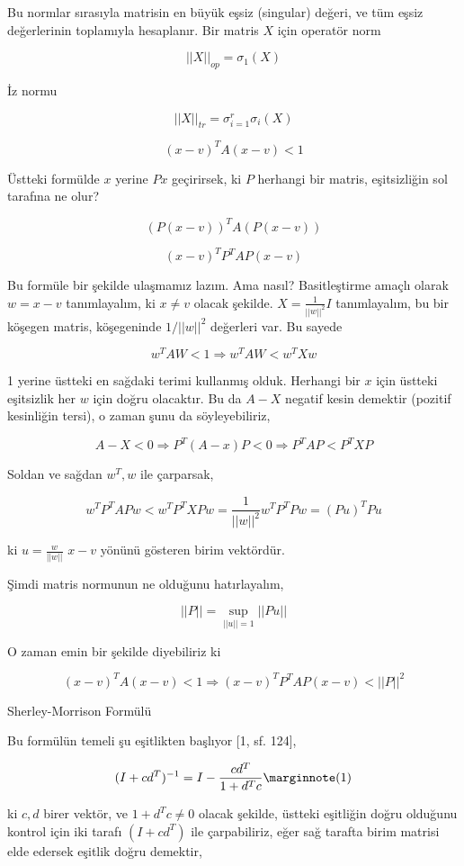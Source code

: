 \documentclass[12pt,fleqn]{article}\usepackage{../../common}
\begin{document}
Bu normlar sırasıyla matrisin en büyük eşsiz (singular) değeri, ve tüm
eşsiz değerlerinin toplamıyla hesaplanır. Bir matris $X$ için operatör norm

$$
||X||_{op} = \sigma_1(X)
$$

İz normu

$$
||X||_{tr} = \sigma_{i=1}^{r} \sigma_i(X)
$$


\newpage

$$ (x-v)^TA(x-v) < 1 $$

Üstteki formülde $x$ yerine $Px$ geçirirsek, ki $P$ herhangi bir matris,
eşitsizliğin sol tarafına ne olur?

$$ (P(x-v))^T A (P(x-v))$$

$$ (x-v)^T P^T A P (x-v)  $$

Bu formüle bir şekilde ulaşmamız lazım. Ama nasıl? Basitleştirme amaçlı olarak
$w = x-v$ tanımlayalım, ki $x \ne v$ olacak şekilde. $X = \frac{1}{||w||^2} I$
tanımlayalım, bu bir köşegen matris, köşegeninde $1/||w||^2$ değerleri var. Bu
sayede

$$ w^T A W < 1  \Rightarrow w^T A W < w^T X w  $$

1 yerine üstteki en sağdaki terimi kullanmış olduk. Herhangi bir $x$ için
üstteki eşitsizlik her $w$ için doğru olacaktır. Bu da $A - X$ negatif kesin
demektir (pozitif kesinliğin tersi), o zaman şunu da söyleyebiliriz,

$$ A - X < 0 \Rightarrow P^T(A-x)P < 0 \Rightarrow P^T AP < P^TXP $$

Soldan ve sağdan $w^T,w$ ile çarparsak,

$$ w^T P^T AP w < w^T P^TXP w = \frac{1}{||w||^2} w^T P^T P w = (Pu)^T Pu$$

ki $u = \frac{w}{||w||}$ $x-v$ yönünü gösteren birim vektördür. 

Şimdi matris normunun ne olduğunu hatırlayalım,

$$ ||P|| = \sup_{||u||=1} || Pu || $$

O zaman emin bir şekilde diyebiliriz ki 

$$ (x-v)^TA(x-v) < 1 \Rightarrow (x-v)^T P^T A P (x-v) < ||P||^2 $$


\newpage 

Sherley-Morrison Formülü

Bu formülün temeli şu eşitlikten başlıyor [1, sf. 124],

$$
(I+cd^T)^{-1} = I - \frac{cd^T}{1+d^Tc}
\mlabel{1}
$$

ki $c,d$ birer vektör, ve $1+d^Tc \ne 0$ olacak şekilde, üstteki eşitliğin
doğru olduğunu kontrol için iki tarafı $(I+cd^T)$ ile çarpabiliriz, eğer
sağ tarafta birim matrisi elde edersek eşitlik doğru demektir,
\end{document}
